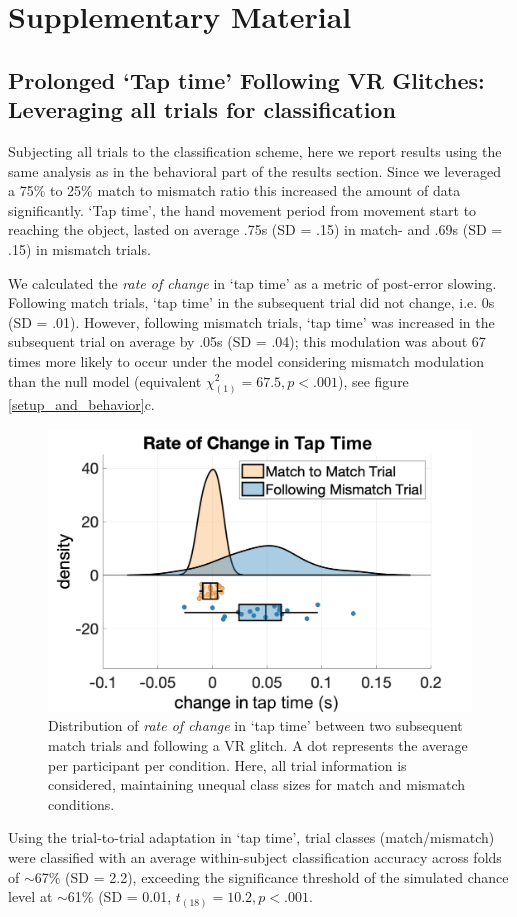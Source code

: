 \section{Supplementary Material}

\subsection{Prolonged `Tap time' Following VR Glitches: Leveraging all trials for classification}

Subjecting all trials to the classification scheme, here we report results using the same analysis as in the behavioral part of the results section. Since we leveraged a 75\% to 25\% match to mismatch ratio this increased the amount of data significantly. `Tap time', the hand movement period from movement start to reaching the object, lasted on average .75s (SD = .15) in match- and .69s (SD = .15) in mismatch trials. 

We calculated the \textit{rate of change} in `tap time' as a metric of post-error slowing. Following match trials, `tap time' in the subsequent trial did not change, i.e. 0s (SD = .01). However, following mismatch trials, `tap time' was increased in the subsequent trial on average by .05s (SD = .04); this modulation was about 67 times more likely to occur under the model considering mismatch modulation than the null model (equivalent ${\chi}^2_{(1)} = 67.5, p<.001$), see figure \ref{setup_and_behavior}c.

\begin{figure}[!h]
  \includegraphics[width=.5\textwidth]{figures/rate_of_change_action_time_all_trials_.jpg}
  \caption{Distribution of \textit{rate of change} in `tap time' between two subsequent match trials and following a VR glitch. A dot represents the average per participant per condition. Here, all trial information is considered, maintaining unequal class sizes for match and mismatch conditions.}
  \label{behavior_supplements}
\end{figure}

Using the trial-to-trial adaptation in `tap time', trial classes (match/mismatch) were classified with an average within-subject classification accuracy across folds of $\sim$67\% (SD = 2.2), exceeding the significance threshold of the simulated chance level at $\sim$61\% (SD = 0.01, $t_{(18)} = 10.2, p < .001$.